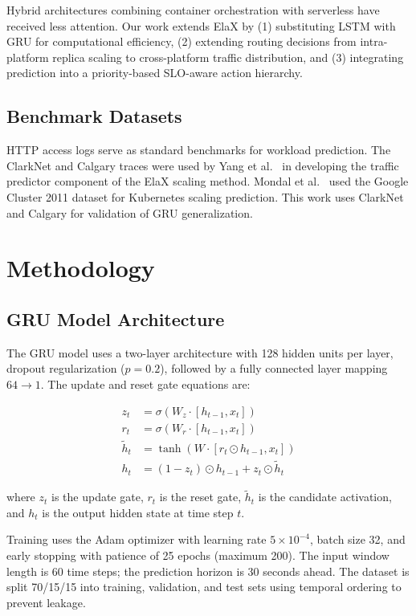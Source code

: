 \documentclass[conference,letterpaper]{IEEEtran}
\begin{document}
Hybrid architectures combining container orchestration with serverless have received less attention. Our work extends ElaX by (1) substituting LSTM with GRU for computational efficiency, (2) extending routing decisions from intra-platform replica scaling to cross-platform traffic distribution, and (3) integrating prediction into a priority-based SLO-aware action hierarchy.

\subsection{Benchmark Datasets}

HTTP access logs serve as standard benchmarks for workload prediction. The ClarkNet and Calgary traces were used by Yang et al.~\cite{yang2019elax} in developing the traffic predictor component of the ElaX scaling method. Mondal et al.~\cite{mondal2023kubernetes} used the Google Cluster 2011 dataset for Kubernetes scaling prediction. This work uses ClarkNet and Calgary for validation of GRU generalization.

\section{Methodology}

\subsection{GRU Model Architecture}

The GRU model uses a two-layer architecture with 128 hidden units per layer, dropout regularization ($p = 0.2$), followed by a fully connected layer mapping $64 \rightarrow 1$. The update and reset gate equations are:

\begin{align}
    z_t &= \sigma(W_z \cdot [h_{t-1}, x_t]) \\
    r_t &= \sigma(W_r \cdot [h_{t-1}, x_t]) \\
    \tilde{h}_t &= \tanh(W \cdot [r_t \odot h_{t-1}, x_t]) \\
    h_t &= (1 - z_t) \odot h_{t-1} + z_t \odot \tilde{h}_t
\end{align}

where $z_t$ is the update gate, $r_t$ is the reset gate, $\tilde{h}_t$ is the candidate activation, and $h_t$ is the output hidden state at time step $t$.

Training uses the Adam optimizer with learning rate $5 \times 10^{-4}$, batch size 32, and early stopping with patience of 25 epochs (maximum 200). The input window length is 60 time steps; the prediction horizon is 30 seconds ahead. The dataset is split 70/15/15 into training, validation, and test sets using temporal ordering to prevent leakage.
\end{document}
